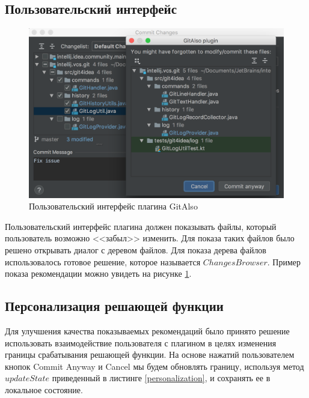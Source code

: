 \subsection{Пользовательский интерфейс}\label{git-also-ui}
\begin{figure}[!h]
\caption{Пользовательский интерфейс плагина GitAlso}\label{git-also-screen}
\centering
\includegraphics[scale=0.6]{GitAlso.png}
\end{figure}
Пользовательский интерфейс плагина должен показывать файлы, который пользователь возможно <<забыл>> изменить. Для показа таких файлов было решено открывать диалог с деревом файлов. Для показа дерева файлов использовалось готовое решение, которое называется $ChangesBrowser$. Пример показа рекомендации можно увидеть на рисунке  \ref{git-also-screen}.
\subsection{Персонализация решающей функции}
Для улучшения качества показываемых рекомендаций было принято решение использовать взаимодействие пользователя с плагином в целях изменения границы срабатывания решающей функции. На основе нажатий пользователем кнопок Commit Anyway и Cancel мы будем обновлять границу, используя метод $updateState$ приведенный в листинге \ref{personalization}, и сохранять ее в локальное состояние.
